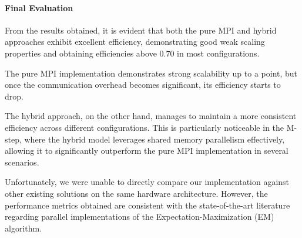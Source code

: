 \paragraph{Final Evaluation}
From the results obtained, it is evident that both the pure MPI and hybrid approaches exhibit excellent efficiency,
demonstrating good weak scaling properties and obtaining efficiencies above $0.70$ in most configurations.

The pure MPI implementation demonstrates strong scalability up to a point, but once the communication overhead becomes
significant, its efficiency starts to drop.

The hybrid approach, on the other hand, manages to maintain a more consistent efficiency across different configurations. 
This is particularly noticeable in the M-step, where the hybrid model leverages shared memory parallelism effectively, allowing it 
to significantly outperform the pure MPI implementation in several scenarios.

Unfortunately, we were unable to directly compare our implementation against other existing 
solutions on the same hardware architecture. However, the performance metrics obtained are consistent with the state-of-the-art
literature regarding parallel implementations of the Expectation-Maximization (EM) algorithm.